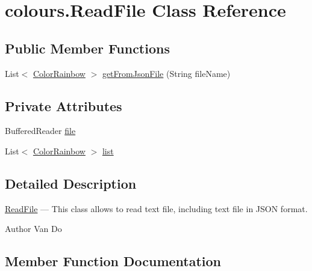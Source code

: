 \hypertarget{classcolours_1_1_read_file}{}\section{colours.\+Read\+File Class Reference}
\label{classcolours_1_1_read_file}
\subsection*{Public Member Functions}
\begin{DoxyCompactItemize}
\item 
List$<$ \hyperlink{classcolours_1_1_color_rainbow}{Color\+Rainbow} $>$ \hyperlink{classcolours_1_1_read_file_a66c626180f88d15c7833677481eede05}{get\+From\+Json\+File} (String file\+Name)
\end{DoxyCompactItemize}
\subsection*{Private Attributes}
\begin{DoxyCompactItemize}
\item 
Buffered\+Reader \hyperlink{classcolours_1_1_read_file_a3d7ab6f2517fbc88e36249963255930a}{file}
\item 
List$<$ \hyperlink{classcolours_1_1_color_rainbow}{Color\+Rainbow} $>$ \hyperlink{classcolours_1_1_read_file_ada4823ab03166bb5b0c388b40460fa7d}{list}
\end{DoxyCompactItemize}


\subsection{Detailed Description}
\hyperlink{classcolours_1_1_read_file}{Read\+File} --- This class allows to read text file, including text file in J\+S\+ON format. \begin{DoxyAuthor}{Author}
Van Do 
\end{DoxyAuthor}


\subsection{Member Function Documentation}
\mbox{\label{classcolours_1_1_read_file_a66c626180f88d15c7833677481eede05}} 
